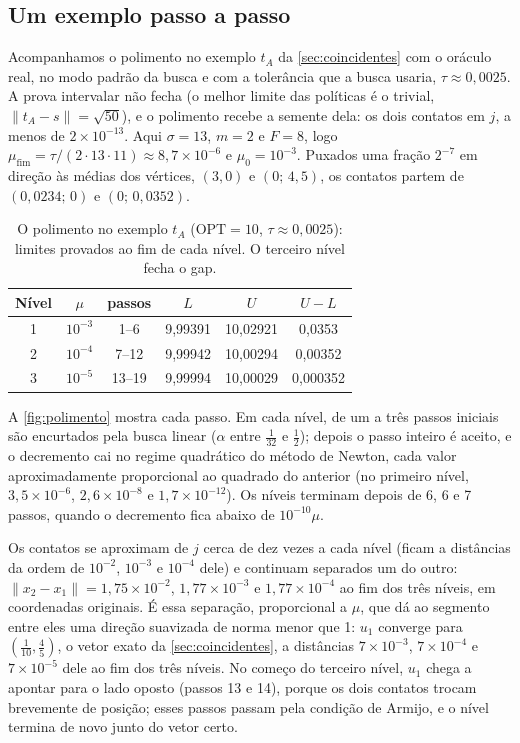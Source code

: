 \documentclass[11pt,a4paper]{article}
\theoremstyle{plain}\newtheorem{proposicao}{Proposição}
\theoremstyle{definition}\newtheorem{definicao}{Definição}
\theoremstyle{plain}\newtheorem{teorema}{Teorema}
\newcommand{\norm}[1]{\lVert#1\rVert}
\newcommand{\OPT}{\mathrm{OPT}}
\begin{document}
\subsection{Um exemplo passo a passo}\label{sec:polimento-exemplo}
Acompanhamos o polimento no exemplo \(t_A\) da \cref{sec:coincidentes} com o oráculo real, no modo padrão da busca e com a tolerância que a busca usaria, \(\tau\approx0{,}0025\). A prova intervalar não fecha (o melhor limite das políticas é o trivial, \(\norm{t_A-s}=\sqrt{50}\)), e o polimento recebe a semente dela: os dois contatos em \(j\), a menos de \(2\times10^{-13}\). Aqui \(\sigma=13\), \(m=2\) e \(F=8\), logo \(\mu_{\text{fim}}=\tau/(2\cdot13\cdot11)\approx8{,}7\times10^{-6}\) e \(\mu_0=10^{-3}\). Puxados uma fração \(2^{-7}\) em direção às médias dos vértices, \((3,0)\) e \((0;\,4{,}5)\), os contatos partem de \((0{,}0234;\,0)\) e \((0;\,0{,}0352)\).

\begin{table}[ht]\centering\small
\begin{tabular}{@{}cccccc@{}}\toprule
Nível & \(\mu\) & passos & \(L\) & \(U\) & \(U-L\)\\\midrule
1 & \(10^{-3}\) & 1–6 & 9,99391 & 10,02921 & 0,0353\\
2 & \(10^{-4}\) & 7–12 & 9,99942 & 10,00294 & 0,00352\\
3 & \(10^{-5}\) & 13–19 & 9,99994 & 10,00029 & 0,000352\\\bottomrule
\end{tabular}
\caption{O polimento no exemplo \(t_A\) (\(\OPT=10\), \(\tau\approx0{,}0025\)): limites provados ao fim de cada nível. O terceiro nível fecha o gap.}\label{tab:polimento}
\end{table}

A \cref{fig:polimento} mostra cada passo. Em cada nível, de um a três passos iniciais são encurtados pela busca linear (\(\alpha\) entre \(\frac1{32}\) e \(\frac12\)); depois o passo inteiro é aceito, e o decremento cai no regime quadrático do método de Newton, cada valor aproximadamente proporcional ao quadrado do anterior (no primeiro nível, \(3{,}5\times10^{-6}\), \(2{,}6\times10^{-8}\) e \(1{,}7\times10^{-12}\)). Os níveis terminam depois de 6, 6 e 7 passos, quando o decremento fica abaixo de \(10^{-10}\mu\).

Os contatos se aproximam de \(j\) cerca de dez vezes a cada nível (ficam a distâncias da ordem de \(10^{-2}\), \(10^{-3}\) e \(10^{-4}\) dele) e continuam separados um do outro: \(\norm{x_2-x_1}=1{,}75\times10^{-2}\), \(1{,}77\times10^{-3}\) e \(1{,}77\times10^{-4}\) ao fim dos três níveis, em coordenadas originais. É essa separação, proporcional a \(\mu\), que dá ao segmento entre eles uma direção suavizada de norma menor que 1: \(u_1\) converge para \((\tfrac1{10},\tfrac45)\), o vetor exato da \cref{sec:coincidentes}, a distâncias \(7\times10^{-3}\), \(7\times10^{-4}\) e \(7\times10^{-5}\) dele ao fim dos três níveis. No começo do terceiro nível, \(u_1\) chega a apontar para o lado oposto (passos 13 e 14), porque os dois contatos trocam brevemente de posição; esses passos passam pela condição de Armijo, e o nível termina de novo junto do vetor certo.
\end{document}
